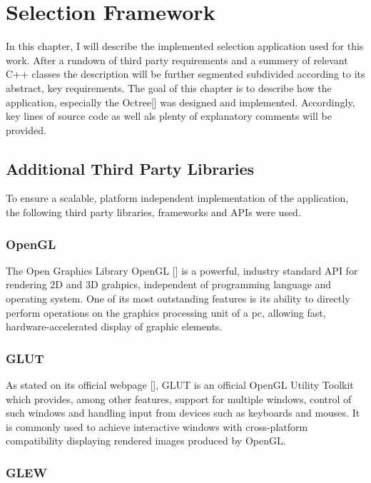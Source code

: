 \chapter{Selection Framework}
\label{sec:selection_framework}

In this chapter, I will describe the implemented selection application used for this work. After a rundown of third party requirements and a summery of relevant C++ classes the description will be further segmented subdivided according to its abstract, key requirements.
The goal of this chapter is to describe how the application, especially the Octree[\cite{Octree}] was designed and implemented. Accordingly, key lines of source code as well als plenty of explanatory comments will be provided.

\section{Additional Third Party Libraries}
\label{sec:additional_third_party_libraries}

To ensure a scalable, platform independent implementation of the application, the following third party libraries, frameworks and APIs were used.

\subsection{OpenGL}
\label{sec:opengl}

The Open Graphics Library OpenGL [\cite{OpenGL}] is a powerful, industry standard API for rendering 2D and 3D grahpics, independent of programming language and operating system. One of its most outstanding features is its ability to directly perform operations on the graphics processing unit of a pc, allowing fast, hardware-accelerated display of graphic elements.

\subsection{GLUT}
\label{sec:glut}

As stated on its official webpage [\cite{GLUT}], GLUT is an official OpenGL Utility Toolkit which provides, among other features, support for multiple windows, control of such windows and handling input from devices such as keyboards and mouses. It is commonly used to achieve interactive windows with cross-platform compatibility displaying rendered images produced by OpenGL.

\subsection{GLEW}
\label{sec:glew}

